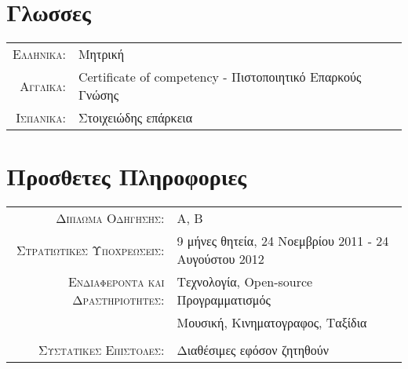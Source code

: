 \documentclass[11pt]{article}
\begin{document}
\section{Γλωσσες}
\begin{tabular}{rl}
\textsc{Ελληνικα:}&Μητρική\\
\textsc{Αγγλικα:}& Certificate of competency - Πιστοποιητικό Επαρκούς Γνώσης \\
\textsc{Ισπανικα:}& Στοιχειώδης επάρκεια\\
\end{tabular}


\section{Προσθετες Πληροφοριες}
\begin{tabular}{rl}
\textsc{Διπλωμα Οδηγησης:} & A, B\\
\textsc{Στρατιωτικες Υποχρεωσεις:} & 9 μήνες θητεία, 24 Νοεμβρίου 2011 - 24 Αυγούστου 2012\\
\textsc{Ενδιαφεροντα και Δραστηριοτητες:} & Τεχνολογία, Open-source Προγραμματισμός\\
& Μουσική, Κινηματογραφος, Ταξίδια\\
&\\
\textsc{Συστατικες Επιστολες:} & Διαθέσιμες εφόσον ζητηθούν\\
\end{tabular}
\end{document}
